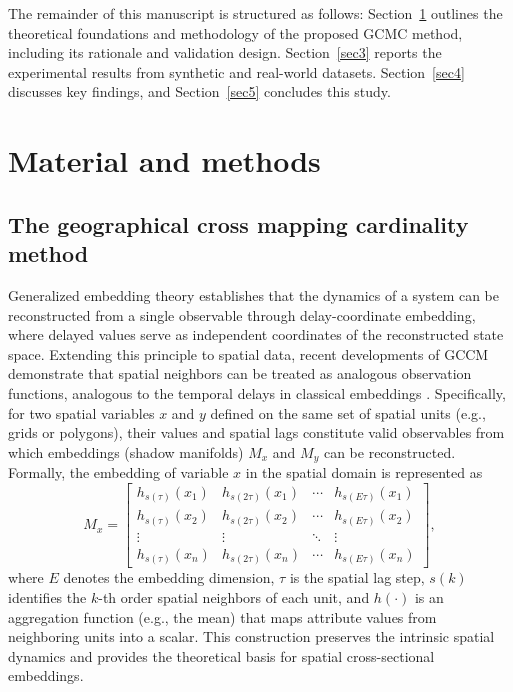 \documentclass[authoryear,preprint,review,12pt]{elsarticle}
\begin{document}
The remainder of this manuscript is structured as follows: Section~\ref{sec2} outlines the theoretical foundations and methodology of the proposed GCMC method, including its rationale and validation design. Section~\ref{sec3} reports the experimental results from synthetic and real-world datasets. Section~\ref{sec4} discusses key findings, and Section~\ref{sec5} concludes this study.

\section{Material and methods}\label{sec2} 

\subsection{The geographical cross mapping cardinality method}

Generalized embedding theory \citep{Takens1981embedding,Mane1981embedding} establishes that the dynamics of a system can be reconstructed from a single observable through delay-coordinate embedding, where delayed values serve as independent coordinates of the reconstructed state space. Extending this principle to spatial data, recent developments of GCCM demonstrate that spatial neighbors can be treated as analogous observation functions, analogous to the temporal delays in classical embeddings \citep{gao2023gccm}. Specifically, for two spatial variables \(x\) and \(y\) defined on the same set of spatial units (e.g., grids or polygons), their values and spatial lags constitute valid observables from which embeddings (shadow manifolds) \(M_x\) and \(M_y\) can be reconstructed. Formally, the embedding of variable \(x\) in the spatial domain is represented as
\begin{equation}\label{eq-embedding}
M_x = \begin{bmatrix}
h_{s(\tau)}(x_1) & h_{s(2\tau)}(x_1) & \cdots & h_{s(E\tau)}(x_1) \\
h_{s(\tau)}(x_2) & h_{s(2\tau)}(x_2) & \cdots & h_{s(E\tau)}(x_2) \\
\vdots & \vdots & \ddots & \vdots \\
h_{s(\tau)}(x_n) & h_{s(2\tau)}(x_n) & \cdots & h_{s(E\tau)}(x_n)
\end{bmatrix},
\end{equation}
\noindent where \(E\) denotes the embedding dimension, \(\tau\) is the spatial lag step, \(s(k)\) identifies the \(k\)-th order spatial neighbors of each unit, and \(h(\cdot)\) is an aggregation function (e.g., the mean) that maps attribute values from neighboring units into a scalar. This construction preserves the intrinsic spatial dynamics and provides the theoretical basis for spatial cross-sectional embeddings.
\end{document}
